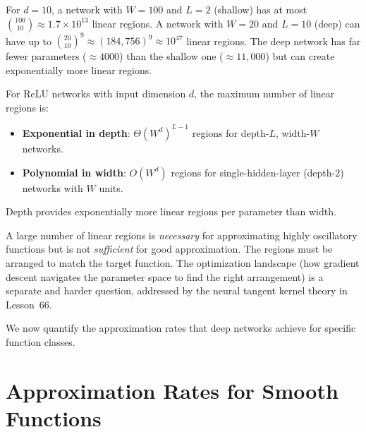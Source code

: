 \documentclass[11pt,a4paper]{article}
\begin{document}
\begin{example}
\label{ex:linear-regions}
For $d = 10$, a network with $W = 100$ and $L = 2$ (shallow) has at
most $\binom{100}{10} \approx 1.7 \times 10^{13}$ linear regions.
A network with $W = 20$ and $L = 10$ (deep) can have up to
$\binom{20}{10}^9 \approx (184{,}756)^9 \approx 10^{47}$ linear
regions.  The deep network has far fewer parameters ($\approx 4000$)
than the shallow one ($\approx 11{,}000$) but can create exponentially
more linear regions.
\end{example}

\begin{keyresult}[title={Depth vs.\ Width in Linear Region Count}]
For ReLU networks with input dimension $d$, the maximum number of linear
regions is:
\begin{itemize}[nosep]
  \item \textbf{Exponential in depth}: $\Theta(W^d)^{L-1}$ regions for
    depth-$L$, width-$W$ networks.
  \item \textbf{Polynomial in width}: $O(W^d)$ regions for
    single-hidden-layer (depth-$2$) networks with $W$ units.
\end{itemize}
Depth provides exponentially more linear regions per parameter than width.
\end{keyresult}

\begin{warning}[title={Linear Regions Do Not Equal Approximation Quality}]
A large number of linear regions is \emph{necessary} for approximating
highly oscillatory functions but is not \emph{sufficient} for good
approximation.  The regions must be arranged to match the target
function.  The optimization landscape (how gradient descent navigates
the parameter space to find the right arrangement) is a separate and
harder question, addressed by the neural tangent kernel theory in
Lesson~66.
\end{warning}

We now quantify the approximation rates that deep networks achieve
for specific function classes.

\section{Approximation Rates for Smooth Functions}
\label{sec:approx-rates}
\end{document}
